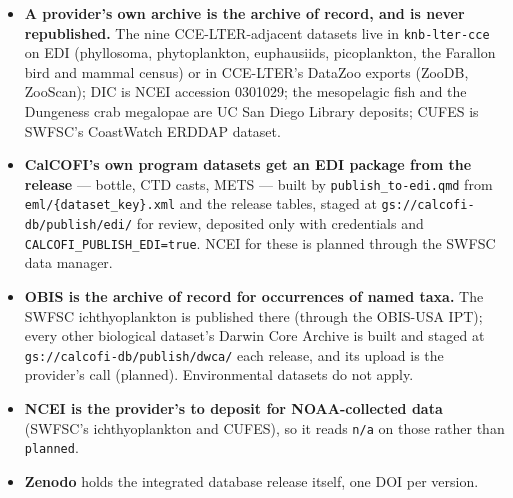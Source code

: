\documentclass[
  letterpaper,
  DIV=11,
  numbers=noendperiod]{scrreprt}
\providecommand{\tightlist}{%
  \setlength{\itemsep}{0pt}\setlength{\parskip}{0pt}}
\begin{document}
\begin{itemize}
\tightlist
\item
  \textbf{A provider's own archive is the archive of record, and is
  never republished.} The nine CCE-LTER-adjacent datasets live in
  \texttt{knb-lter-cce} on EDI (phyllosoma, phytoplankton, euphausiids,
  picoplankton, the Farallon bird and mammal census) or in CCE-LTER's
  DataZoo exports (ZooDB, ZooScan); DIC is NCEI accession 0301029; the
  mesopelagic fish and the Dungeness crab megalopae are UC San Diego
  Library deposits; CUFES is SWFSC's CoastWatch ERDDAP dataset.
\item
  \textbf{CalCOFI's own program datasets get an EDI package from the
  release} --- bottle, CTD casts, METS --- built by
  \texttt{publish\_to-edi.qmd} from \texttt{eml/\{dataset\_key\}.xml}
  and the release tables, staged at
  \texttt{gs://calcofi-db/publish/edi/} for review, deposited only with
  credentials and \texttt{CALCOFI\_PUBLISH\_EDI=true}. NCEI for these is
  planned through the SWFSC data manager.
\item
  \textbf{OBIS is the archive of record for occurrences of named taxa.}
  The SWFSC ichthyoplankton is published there (through the OBIS-USA
  IPT); every other biological dataset's Darwin Core Archive is built
  and staged at \texttt{gs://calcofi-db/publish/dwca/} each release, and
  its upload is the provider's call (planned). Environmental datasets do
  not apply.
\item
  \textbf{NCEI is the provider's to deposit for NOAA-collected data}
  (SWFSC's ichthyoplankton and CUFES), so it reads \texttt{n/a} on those
  rather than \texttt{planned}.
\item
  \textbf{Zenodo} holds the integrated database release itself, one DOI
  per version.
\end{itemize}
\end{document}
